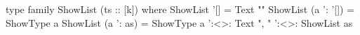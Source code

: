 \begin{code}
type family ShowList (ts :: [k]) where
  ShowList '[] = Text ""
  ShowList (a ': '[]) = ShowType a
  ShowList (a ': as)  =
    ShowType a ':<>: Text ", " ':<>: ShowList as
\end{code}
